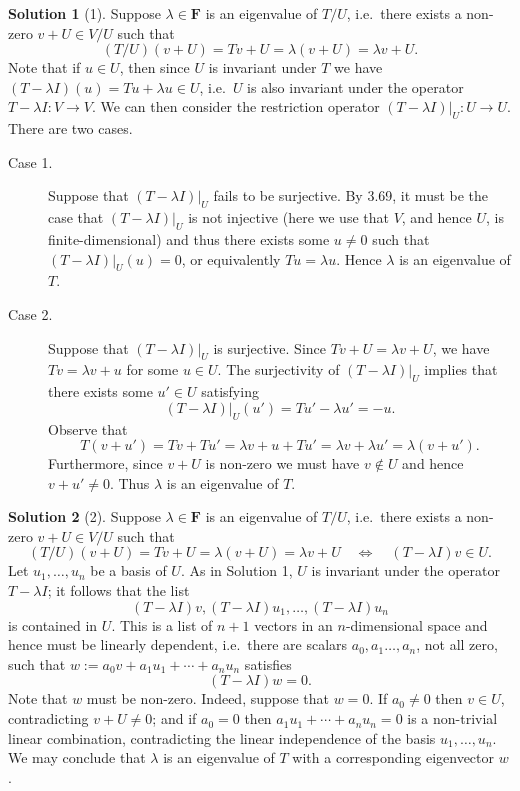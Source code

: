 \documentclass[12pt]{article}
\theoremstyle{definition}
\theoremstyle{exercise}
\theoremstyle{solution}
\newtheorem*{solution}{Solution}
\newcommand{\F}{\mathbf{F}}
\begin{document}
\begin{solution}[1]
    Suppose \( \lambda \in \F \) is an eigenvalue of \( T/U \), i.e.\ there exists a non-zero \( v + U \in V/U \) such that
    \[
        (T/U)(v + U) = Tv + U = \lambda(v + U) = \lambda v + U.
    \]
    Note that if \( u \in U \), then since \( U \) is invariant under \( T \) we have \( (T - \lambda I)(u) = Tu + \lambda u \in U \), i.e.\ \( U \) is also invariant under the operator \( T - \lambda I : V \to V \). We can then consider the restriction operator \( (T - \lambda I)|_U : U \to U \). There are two cases.
    \begin{description}
        \item[Case 1.] Suppose that \( (T - \lambda I)|_U \) fails to be surjective. By 3.69, it must be the case that \( (T - \lambda I)|_U \) is not injective (here we use that \( V \), and hence \( U \), is finite-dimensional) and thus there exists some \( u \neq 0 \) such that \( (T - \lambda I)|_U(u) = 0 \), or equivalently \( Tu = \lambda u \). Hence \( \lambda \) is an eigenvalue of \( T \).

        \item[Case 2.] Suppose that \( (T - \lambda I)|_U \) is surjective. Since \( Tv + U = \lambda v + U \), we have \( Tv = \lambda v + u \) for some \( u \in U \). The surjectivity of \( (T - \lambda I)|_U \) implies that there exists some \( u' \in U \) satisfying
        \[
            (T - \lambda I)|_U(u') = Tu' - \lambda u' = -u.
        \]
        Observe that
        \[
            T(v + u') = Tv + Tu' = \lambda v + u + Tu' = \lambda v + \lambda u' = \lambda(v + u').
        \]
        Furthermore, since \( v + U \) is non-zero we must have \( v \not\in U \) and hence \( v + u' \neq 0 \). Thus \( \lambda \) is an eigenvalue of \( T \).
    \end{description}
\end{solution}

\begin{solution}[2]
    Suppose \( \lambda \in \F \) is an eigenvalue of \( T/U \), i.e.\ there exists a non-zero \( v + U \in V/U \) such that
    \[
        (T/U)(v + U) = Tv + U = \lambda(v + U) = \lambda v + U \quad \iff \quad (T - \lambda I)v \in U.
    \]
    Let \( u_1, \ldots, u_n \) be a basis of \( U \). As in Solution 1, \( U \) is invariant under the operator \( T - \lambda I \); it follows that the list
    \[
        (T - \lambda I)v, (T - \lambda I)u_1, \ldots, (T - \lambda I)u_n
    \]
    is contained in \( U \). This is a list of \( n + 1 \) vectors in an \( n \)-dimensional space and hence must be linearly dependent, i.e.\ there are scalars \( a_0, a_1 \ldots, a_n \), not all zero, such that \( w := a_0 v + a_1 u_1 + \cdots + a_n u_n \) satisfies
    \[
        (T - \lambda I)w = 0.
    \]
    Note that \( w \) must be non-zero. Indeed, suppose that \( w = 0 \). If \( a_0 \neq 0 \) then \( v \in U \), contradicting \( v + U \neq 0 \); and if \( a_0 = 0 \) then \( a_1 u_1 + \cdots + a_n u_n = 0 \) is a non-trivial linear combination, contradicting the linear independence of the basis \( u_1, \ldots, u_n \). We may conclude that \( \lambda \) is an eigenvalue of \( T \) with a corresponding eigenvector \( w \).
\end{solution}
\end{document}
